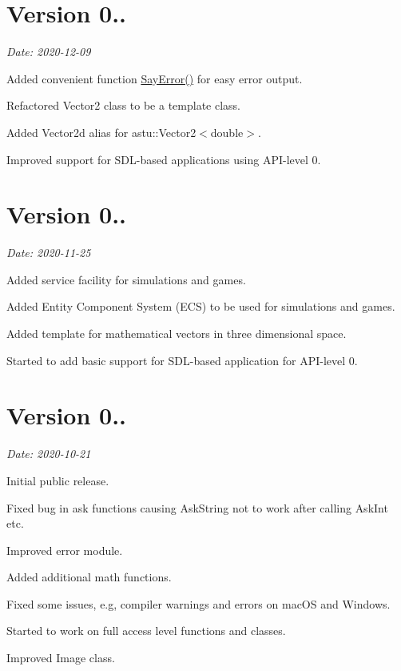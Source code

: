 \section*{Version 0..}

{\itshape Date\+: 2020-\/12-\/09}


\begin{DoxyItemize}
\item Added convenient function {\ttfamily \hyperlink{group__io__group_gaa8fd8044fbf35d58e73087b6399cd82a}{Say\+Error()}} for easy error output.
\item Refactored {\ttfamily Vector2} class to be a template class.
\item Added {\ttfamily Vector2d} alias for astu\+::\+Vector2$<$double$>$.
\item Improved support for S\+D\+L-\/based applications using A\+P\+I-\/level 0.
\end{DoxyItemize}

\section*{Version 0..}

{\itshape Date\+: 2020-\/11-\/25}


\begin{DoxyItemize}
\item Added service facility for simulations and games.
\item Added Entity Component System (E\+CS) to be used for simulations and games.
\item Added template for mathematical vectors in three dimensional space.
\item Started to add basic support for S\+D\+L-\/based application for A\+P\+I-\/level 0.
\end{DoxyItemize}

\section*{Version 0..}

{\itshape Date\+: 2020-\/10-\/21}


\begin{DoxyItemize}
\item Initial public release.
\item Fixed bug in ask functions causing {\ttfamily Ask\+String} not to work after calling {\ttfamily Ask\+Int} etc.
\item Improved error module.
\item Added additional math functions.
\item Fixed some issues, e.\+g, compiler warnings and errors on mac\+OS and Windows.
\item Started to work on full access level functions and classes.
\item Improved Image class.
\end{DoxyItemize}

